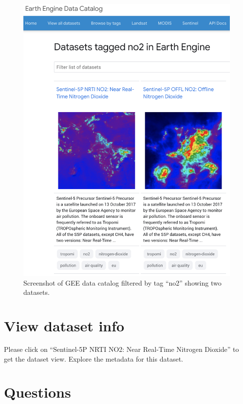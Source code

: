 \documentclass[]{book}
\begin{document}
\begin{figure}
\centering
\includegraphics{images/gee_datasets-tag-no2.png}
\caption{Screenshot of GEE data catalog filtered by tag ``no2'' showing two datasets.}
\end{figure}

\hypertarget{view-dataset-info}{%
\section{View dataset info}\label{view-dataset-info}}

Please click on ``Sentinel-5P NRTI NO2: Near Real-Time Nitrogen Dioxide'' to get the dataset view. Explore the metadata for this dataset.

\hypertarget{questions}{%
\section{Questions}\label{questions}}
\end{document}
